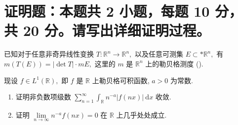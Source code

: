 \section{证明题：本题共 2 小题，每题 10 分，共 20 分。请写出详细证明过程。}


\begin{question}[points = 10]
已知对于任意非奇异线性变换 $T: \mathbb{R}^n \to \mathbb{R}^n,$ 以及任意可测集 $E \subset* \mathbb{R}^n,$ 有 $m(T(E)) = \lvert \det T \rvert \cdot m E,$ 这里的 $m$ 是 $\mathbb{R}^n$ 上的勒贝格测度 ().

现设 $f \in L^1(\mathbb{R}),$ 即 $f$ 是 $\mathbb{R}$ 上勒贝格可积函数, $a > 0$ 为常数.
\begin{enumerate}
\item 证明非负数项级数 $\sum_{n = 1}^\infty \int_{\mathbb{R}} n^{-a} \lvert f(nx) \rvert ~ \mathrm{d} x$ 收敛.
\item 证明 $\lim\limits_{n\to\infty} n^{-a} f(nx) = 0$ 在 $\mathbb{R}$ 上几乎处处成立.
\end{enumerate}

\end{question}

